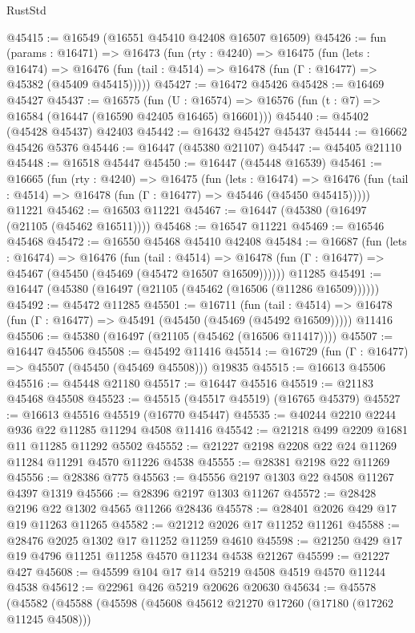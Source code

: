 \begin{lexlean}{RustStd}
\begin{coremodule}
{\begin{coremodule}
{{{{{{{{{{{{{{{{{{{{{{{{{{{{{{{{{{{{{{{{{{{{{{{{{{{{{{{@45415 := @16549 (@16551 @45410 @42408 @16507 @16509)
@45426 := fun (params : @16471) =>
  @16473
    (fun (rty : @4240) =>
    @16475
      (fun (lets : @16474) =>
      @16476 (fun (tail : @4514) => @16478 (fun (Γ : @16477) => @45382 (@45409 @45415)))))
@45427 := @16472 @45426
@45428 := @16469 @45427
@45437 := @16575
    (fun (U : @16574) => @16576 (fun (t : @7) => @16584 (@16447 (@16590 @42405 @16465) @16601)))
@45440 := @45402 (@45428 @45437) @42403
@45442 := @16432 @45427 @45437
@45444 := @16662 @45426 @5376
@45446 := @16447 (@45380 @21107)
@45447 := @45405 @21110
@45448 := @16518 @45447
@45450 := @16447 (@45448 @16539)
@45461 := @16665
    (fun (rty : @4240) =>
    @16475
      (fun (lets : @16474) =>
      @16476 (fun (tail : @4514) => @16478 (fun (Γ : @16477) => @45446 (@45450 @45415)))))
    @11221
@45462 := @16503 @11221
@45467 := @16447 (@45380 (@16497 (@21105 (@45462 @16511))))
@45468 := @16547 @11221
@45469 := @16546 @45468
@45472 := @16550 @45468 @45410 @42408
@45484 := @16687
    (fun (lets : @16474) =>
    @16476
      (fun (tail : @4514) =>
      @16478 (fun (Γ : @16477) => @45467 (@45450 (@45469 (@45472 @16507 @16509))))))
    @11285
@45491 := @16447 (@45380 (@16497 (@21105 (@45462 (@16506 (@11286 @16509))))))
@45492 := @45472 @11285
@45501 := @16711
    (fun (tail : @4514) => @16478 (fun (Γ : @16477) => @45491 (@45450 (@45469 (@45492 @16509)))))
    @11416
@45506 := @45380 (@16497 (@21105 (@45462 (@16506 @11417))))
@45507 := @16447 @45506
@45508 := @45492 @11416
@45514 := @16729 (fun (Γ : @16477) => @45507 (@45450 (@45469 @45508))) @19835
@45515 := @16613 @45506
@45516 := @45448 @21180
@45517 := @16447 @45516
@45519 := @21183 @45468 @45508
@45523 := @45515 (@45517 @45519) (@16765 @45379)
@45527 := @16613 @45516 @45519 (@16770 @45447)
@45535 := @40244 @2210 @2244 @936 @22 @11285 @11294 @4508 @11416
@45542 := @21218 @499 @2209 @1681 @11 @11285 @11292 @5502
@45552 := @21227 @2198 @2208 @22 @24 @11269 @11284 @11291 @4570 @11226 @4538
@45555 := @28381 @2198 @22 @11269
@45556 := @28386 @775
@45563 := @45556 @2197 @1303 @22 @4508 @11267 @4397 @1319
@45566 := @28396 @2197 @1303 @11267
@45572 := @28428 @2196 @22 @1302 @4565 @11266 @28436
@45578 := @28401 @2026 @429 @17 @19 @11263 @11265
@45582 := @21212 @2026 @17 @11252 @11261
@45588 := @28476 @2025 @1302 @17 @11252 @11259 @4610
@45598 := @21250 @429 @17 @19 @4796 @11251 @11258 @4570 @11234 @4538 @21267
@45599 := @21227 @427
@45608 := @45599 @104 @17 @14 @5219 @4508 @4519 @4570 @11244 @4538
@45612 := @22961 @426 @5219 @20626 @20630
@45634 := @45578
    (@45582
      (@45588
        (@45598
          (@45608 @45612 @21270 @17260 (@17180 (@17262 @11245 @4508)))
}}}}}}}}}}}}}}}}}}}}}}}}}}}}}}}}}}}}}}}}}}}}}}}}}}}}}}}
\end{coremodule}}
\end{coremodule}
\end{lexlean}
